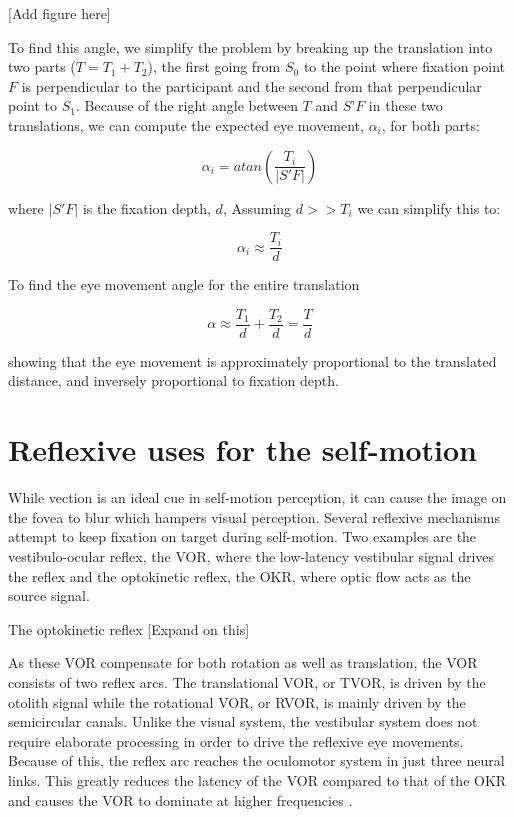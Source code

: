 [Add figure here]

To find this angle, we simplify the problem by breaking up the translation into two parts ($T = T_1 + T_2$), the first going from $S_0$ to the point where fixation point $F$ is perpendicular to the participant and the second from that perpendicular point to $S_1$. Because of the right angle between $T$ and $S’F$ in these two translations, we can compute the expected eye movement, $\alpha_i$, for both parts:

\begin{equation}
\alpha_i = atan(\frac{T_i}{|S'F|})
\end{equation}

where $|S'F|$ is the fixation depth, $d$, Assuming $d >> T_i$ we can simplify this to:

\begin{equation}
\alpha_i \approx \frac{T_i}{d}
\end{equation}

To find the eye movement angle for the entire translation

\begin{equation}
\alpha \approx \frac{T_1}{d} + \frac{T_2}{d} = \frac{T}{d}
\end{equation}

showing that the eye movement is approximately proportional to the translated distance, and inversely proportional to fixation depth.

\section{Reflexive uses for the self-motion}
While vection is an ideal cue in self-motion perception, it can cause the image on the fovea to blur which hampers visual perception. Several reflexive mechanisms attempt to keep fixation on target during self-motion. Two examples are the vestibulo-ocular reflex, the VOR, where the low-latency vestibular signal drives the reflex and the optokinetic reflex, the OKR, where optic flow acts as the source signal.

The optokinetic reflex [Expand on this]

As these VOR compensate for both rotation as well as translation, the VOR consists of two reflex arcs. The translational VOR, or TVOR, is driven by the otolith signal while the rotational VOR, or RVOR, is mainly driven by the semicircular canals. Unlike the visual system, the vestibular system does not require elaborate processing in order to drive the reflexive eye movements. Because of this, the reflex arc reaches the oculomotor system in just three neural links. This greatly reduces the latency of the VOR compared to that of the OKR and causes the VOR to dominate at higher frequencies \cite{schweigart1997}.

